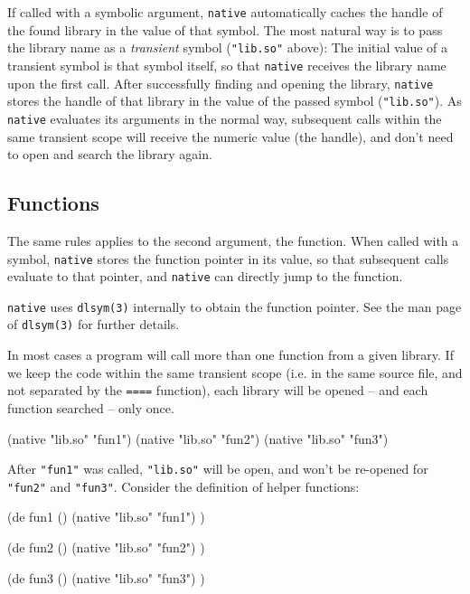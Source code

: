 If called with a symbolic argument, \texttt{native} automatically
caches the handle of the found library in the value of that symbol.
The most natural way is to pass the library name as a \emph{transient}
symbol (\texttt{"lib.so"} above): The initial value of a transient
symbol is that symbol itself, so that \texttt{native} receives the
library name upon the first call. After successfully finding and
opening the library, \texttt{native} stores the handle of that library
in the value of the passed symbol (\texttt{"lib.so"}). As
\texttt{native} evaluates its arguments in the normal way, subsequent
calls within the same transient scope will receive the numeric value
(the handle), and don't need to open and search the library again.


\subsection{Functions}
\label{sec:native-functions}

The same rules applies to the second argument, the function. When called
with a symbol, \texttt{native} stores the function pointer in its value,
so that subsequent calls evaluate to that pointer, and \texttt{native}
can directly jump to the function.

\texttt{native} uses \texttt{dlsym(3)} internally to obtain the function
pointer. See the man page of \texttt{dlsym(3)} for further details.

In most cases a program will call more than one function from a given
library. If we keep the code within the same transient scope (i.e. in
the same source file, and not separated by the \texttt{====} function),
each library will be opened -- and each function searched -- only once.

\begin{wideverbatim}
(native "lib.so" "fun1")
(native "lib.so" "fun2")
(native "lib.so" "fun3")
\end{wideverbatim}

After \texttt{"fun1"} was called, \texttt{"lib.so"} will be open, and
won't be re-opened for \texttt{"fun2"} and \texttt{"fun3"}. Consider the
definition of helper functions:

\begin{wideverbatim}
(de fun1 ()
   (native "lib.so" "fun1") )

(de fun2 ()
   (native "lib.so" "fun2") )

(de fun3 ()
   (native "lib.so" "fun3") )
\end{wideverbatim}

